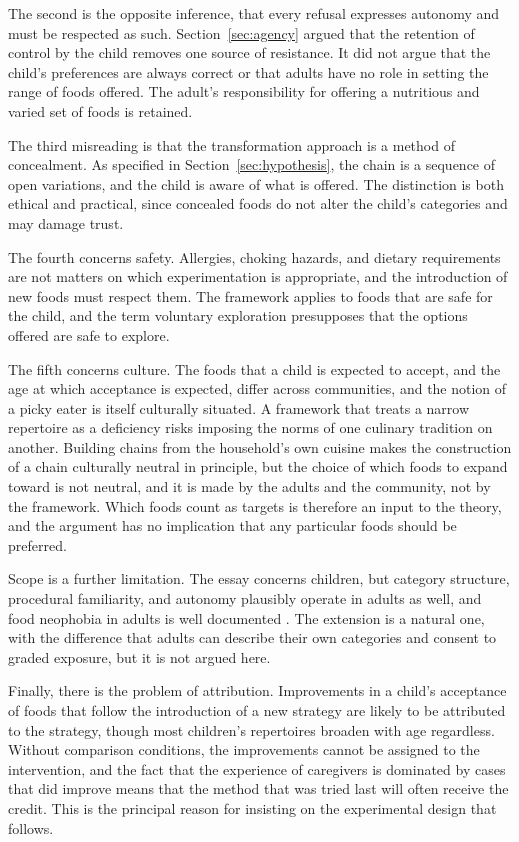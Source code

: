 \documentclass[11pt]{article}
\theoremstyle{remark}
\begin{document}
The second is the opposite inference, that every refusal expresses autonomy and must be respected as such. Section~\ref{sec:agency} argued that the retention of control by the child removes one source of resistance. It did not argue that the child's preferences are always correct or that adults have no role in setting the range of foods offered. The adult's responsibility for offering a nutritious and varied set of foods is retained.

The third misreading is that the transformation approach is a method of concealment. As specified in Section~\ref{sec:hypothesis}, the chain is a sequence of open variations, and the child is aware of what is offered. The distinction is both ethical and practical, since concealed foods do not alter the child's categories and may damage trust.

The fourth concerns safety. Allergies, choking hazards, and dietary requirements are not matters on which experimentation is appropriate, and the introduction of new foods must respect them. The framework applies to foods that are safe for the child, and the term voluntary exploration presupposes that the options offered are safe to explore.

The fifth concerns culture. The foods that a child is expected to accept, and the age at which acceptance is expected, differ across communities, and the notion of a picky eater is itself culturally situated. A framework that treats a narrow repertoire as a deficiency risks imposing the norms of one culinary tradition on another. Building chains from the household's own cuisine makes the construction of a chain culturally neutral in principle, but the choice of which foods to expand toward is not neutral, and it is made by the adults and the community, not by the framework. Which foods count as targets is therefore an input to the theory, and the argument has no implication that any particular foods should be preferred.

Scope is a further limitation. The essay concerns children, but category structure, procedural familiarity, and autonomy plausibly operate in adults as well, and food neophobia in adults is well documented \citep{pliner1992development}. The extension is a natural one, with the difference that adults can describe their own categories and consent to graded exposure, but it is not argued here.

Finally, there is the problem of attribution. Improvements in a child's acceptance of foods that follow the introduction of a new strategy are likely to be attributed to the strategy, though most children's repertoires broaden with age regardless. Without comparison conditions, the improvements cannot be assigned to the intervention, and the fact that the experience of caregivers is dominated by cases that did improve means that the method that was tried last will often receive the credit. This is the principal reason for insisting on the experimental design that follows.
\end{document}
